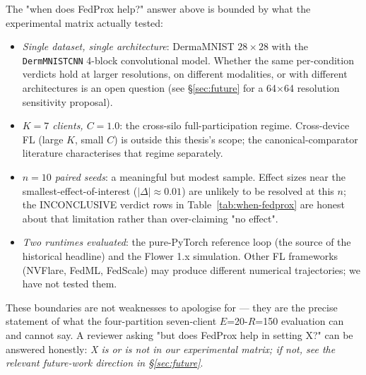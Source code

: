 The "when does FedProx help?" answer above is bounded by what the
experimental matrix actually tested:

\begin{itemize}
  \item \emph{Single dataset, single architecture}: DermaMNIST
        $28\times28$ with the \texttt{DermMNISTCNN} 4-block
        convolutional model. Whether the same per-condition
        verdicts hold at larger resolutions, on different
        modalities, or with different architectures is an open
        question (see \S\ref{sec:future} for a 64$\times$64
        resolution sensitivity proposal).
  \item \emph{$K = 7$ clients, $C = 1.0$}: the cross-silo
        full-participation regime. Cross-device FL (large $K$,
        small $C$) is outside this thesis's scope; the
        canonical-comparator literature \citep{kairouz2021advances}
        characterises that regime separately.
  \item \emph{$n = 10$ paired seeds}: a meaningful but modest
        sample. Effect sizes near the smallest-effect-of-interest
        ($|\Delta| \approx 0.01$) are unlikely to be resolved at
        this $n$; the INCONCLUSIVE verdict rows in
        Table~\ref{tab:when-fedprox} are honest about that
        limitation rather than over-claiming "no effect".
  \item \emph{Two runtimes evaluated}: the pure-PyTorch reference
        loop (the source of the historical headline) and the
        Flower 1.x simulation. Other FL frameworks (NVFlare,
        FedML, FedScale) may produce different numerical
        trajectories; we have not tested them.
\end{itemize}

These boundaries are not weaknesses to apologise for — they are
the precise statement of what the four-partition seven-client
$E$=20-$R$=150 evaluation can and cannot say. A reviewer
asking "but does FedProx help in setting X?" can be answered
honestly: \emph{X is or is not in our experimental matrix;
if not, see the relevant future-work direction in
\S\ref{sec:future}}.
